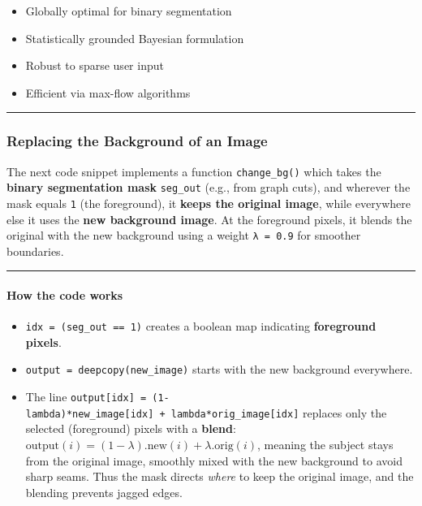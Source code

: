 \documentclass[11pt]{article}
\providecommand{\tightlist}{%
      \setlength{\itemsep}{0pt}\setlength{\parskip}{0pt}}
\begin{document}
\begin{itemize}
\tightlist
\item
  Globally optimal for binary segmentation
\item
  Statistically grounded Bayesian formulation
\item
  Robust to sparse user input
\item
  Efficient via max-flow algorithms
\end{itemize}

\begin{center}\rule{0.5\linewidth}{0.5pt}\end{center}

\hypertarget{replacing-the-background-of-an-image}{%
\subsubsection{\texorpdfstring{\textbf{Replacing the Background of an
Image}}{Replacing the Background of an Image}}\label{replacing-the-background-of-an-image}}

The next code snippet implements a function \texttt{change\_bg()} which
takes the \textbf{binary segmentation mask} \texttt{seg\_out} (e.g.,
from graph cuts), and wherever the mask equals \texttt{1} (the
foreground), it \textbf{keeps the original image}, while everywhere else
it uses the \textbf{new background image}. At the foreground pixels, it
blends the original with the new background using a weight
\texttt{λ\ =\ 0.9} for smoother boundaries.

\begin{center}\rule{0.5\linewidth}{0.5pt}\end{center}

\hypertarget{how-the-code-works}{%
\paragraph{\texorpdfstring{\textbf{How the code
works}}{How the code works}}\label{how-the-code-works}}

\begin{itemize}
\tightlist
\item
  \texttt{idx\ =\ (seg\_out\ ==\ 1)} creates a boolean map indicating
  \textbf{foreground pixels}.
\item
  \texttt{output\ =\ deepcopy(new\_image)} starts with the new
  background everywhere.
\item
  The line
  \texttt{output{[}idx{]}\ =\ (1-lambda)*new\_image{[}idx{]}\ +\ lambda*orig\_image{[}idx{]}}
  replaces only the selected (foreground) pixels with a \textbf{blend}:
  \(\text{output}(i) = (1-\lambda).\text{new}(i) + \lambda.\text{orig}(i)\),
  meaning the subject stays from the original image, smoothly mixed with
  the new background to avoid sharp seams. Thus the mask directs
  \emph{where} to keep the original image, and the blending prevents
  jagged edges.
\end{itemize}
\end{document}
